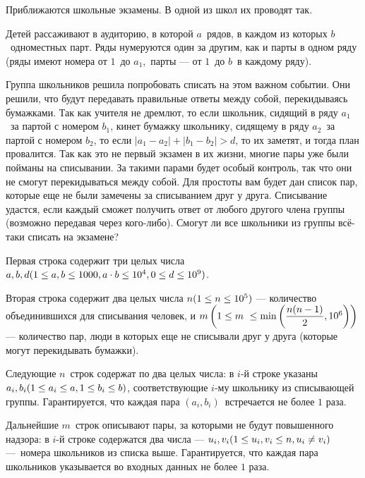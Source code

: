 
Приближаются школьные экзамены. В одной из школ их проводят так.

Детей рассаживают в аудиторию, в которой $a$ рядов, в каждом из которых $b$ одноместных парт. Ряды нумеруются один за другим, как и парты в одном ряду (ряды имеют номера от $1$ до $a_1$, парты — от $1$ до $b$ в каждому ряду). 

Группа школьников решила попробовать списать на этом важном событии. Они решили, что будут передавать правильные ответы между собой, перекидываясь бумажками. Так как учителя не дремлют, то если школьник, сидящий в ряду $a_1$ за партой с номером $b_1$, кинет бумажку школьнику, сидящему в ряду $a_2$ за партой с номером $b_2$, то если $\left|a_1-a_2\right| + \left|b_1-b_2\right| > d$, то их заметят, и тогда план провалится. Так как это не первый экзамен в их жизни, многие пары уже были пойманы на списывании. За такими парами будет особый контроль, так что они не смогут перекидываться между собой. Для простоты вам будет дан список пар, которые еще не были замечены за списыванием друг у друга. Списывание удастся, если каждый сможет получить ответ от любого другого члена группы (возможно передавая через кого-либо). Смогут ли все школьники из группы всё-таки списать на экзамене?


Первая строка содержит три целых числа $a, b, d\space (1\leq a, b\leq 1000,\space a\cdot b \leq 10^4,\space 0\leq d\leq 10^9)$.

Вторая строка содержит два целых числа $n\space(1\leq n \leq 10^5)$ — количество объединившихся для списывания человек, и $m\space\left(1\leq m \leq \min{\left(\dfrac{n(n-1)}{2}, 10^6\right)}\right)$ — количество пар, люди в которых еще не списывали друг у друга (которые могут перекидывать бумажки).

Следующие $n$ строк содержат по два целых числа: в $i$-й строке указаны $a_i, b_i\space(1\leq a_i\leq a,\space 1\leq b_i\leq b)$, соответствующие $i$-му школьнику из списывающей группы. Гарантируется, что каждая пара $\left(a_i, b_i\right)$ встречается не более $1$ раза.

Дальнейшие $m$ строк описывают пары, за которыми не будут повышенного надзора: в $i$-й строке содержатся два числа — $u_i, v_i\space (1\leq u_i, v_i \leq n, \space u_i \neq v_i)$ — номера школьников из списка выше. Гарантируется, что каждая пара школьников указывается во входных данных не более $1$ раза.

